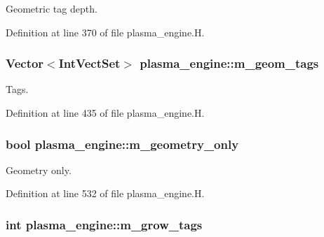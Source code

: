 Geometric tag depth. 



Definition at line 370 of file plasma\+\_\+engine.\+H.

\subsubsection[{\texorpdfstring{m\+\_\+geom\+\_\+tags}{m_geom_tags}}]{\setlength{\rightskip}{0pt plus 5cm}Vector$<$Int\+Vect\+Set$>$ plasma\+\_\+engine\+::m\+\_\+geom\+\_\+tags\hspace{0.3cm}{\ttfamily [protected]}}\hypertarget{classplasma__engine_a1a1df7d26332af8f1b3407faa3276ed5}{}\label{classplasma__engine_a1a1df7d26332af8f1b3407faa3276ed5}


Tags. 



Definition at line 435 of file plasma\+\_\+engine.\+H.

\subsubsection[{\texorpdfstring{m\+\_\+geometry\+\_\+only}{m_geometry_only}}]{\setlength{\rightskip}{0pt plus 5cm}bool plasma\+\_\+engine\+::m\+\_\+geometry\+\_\+only\hspace{0.3cm}{\ttfamily [protected]}}\hypertarget{classplasma__engine_a6f0dc470c441ce1d444fbe82659fb164}{}\label{classplasma__engine_a6f0dc470c441ce1d444fbe82659fb164}


Geometry only. 



Definition at line 532 of file plasma\+\_\+engine.\+H.

\subsubsection[{\texorpdfstring{m\+\_\+grow\+\_\+tags}{m_grow_tags}}]{\setlength{\rightskip}{0pt plus 5cm}int plasma\+\_\+engine\+::m\+\_\+grow\+\_\+tags\hspace{0.3cm}{\ttfamily [protected]}}\hypertarget{classplasma__engine_a7710549e3587cbc4f27690370d22a7fb}{}\label{classplasma__engine_a7710549e3587cbc4f27690370d22a7fb}


